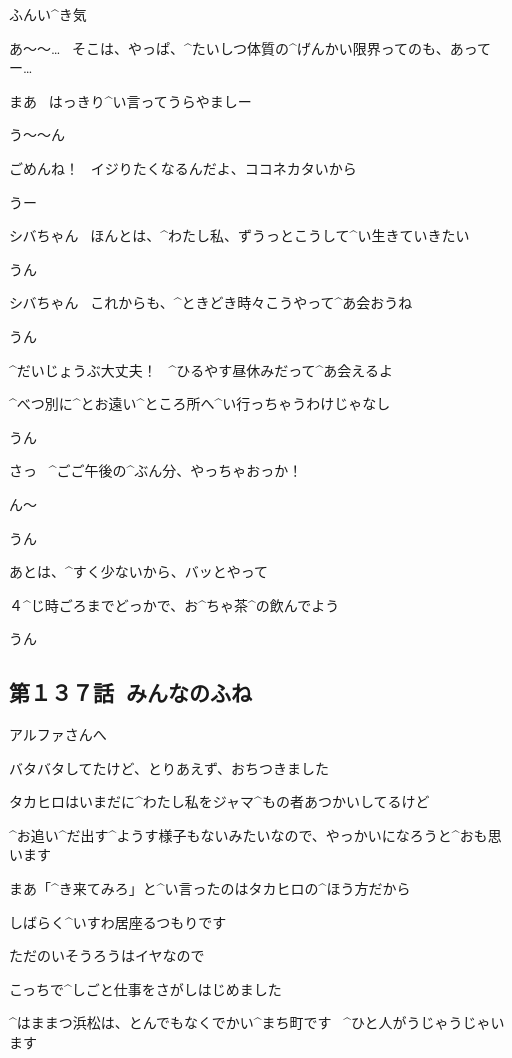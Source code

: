 \SH ふんい^{き}{気}

\K あ〜〜…
\ そこは、やっぱ、^{たいしつ}{体質}の^{げんかい}{限界}ってのも、あってー…

\SH まあ
\ はっきり^{い}{言}ってうらやましー

\K う〜〜ん

\page
\SH ごめんね！
\ イジりたくなるんだよ、ココネカタいから

\K うー

\page
\K シバちゃん
\ ほんとは、^{わたし}{私}、ずうっとこうして^{い}{生}きていきたい

\SH うん

\page
\K シバちゃん
\ これからも、^{ときどき}{時々}こうやって^{あ}{会}おうね

\SH うん

\SH ^{だいじょうぶ}{大丈夫}！
\ ^{ひるやす}{昼休}みだって^{あ}{会}えるよ

\SH ^{べつ}{別}に^{とお}{遠}い^{ところ}{所}へ^{い}{行}っちゃうわけじゃなし

\K うん

\page[86]
\SH さっ
\ ^{ごご}{午後}の^{ぶん}{分}、やっちゃおっか！

\SH ん〜

\K うん

\SH あとは、^{すく}{少}ないから、バッとやって

\SH ４^{じ}{時}ごろまでどっかで、お^{ちゃ}{茶}^{の}{飲}んでよう

\K うん


\subsection{第１３７話\ みんなのふね}

\page[92]
\M アルファさんへ

\page
\M バタバタしてたけど、とりあえず、おちつきました

\M タカヒロはいまだに^{わたし}{私}をジャマ^{もの}{者}あつかいしてるけど

\M ^{お}{追}い^{だ}{出}す^{ようす}{様子}もないみたいなので、やっかいになろうと^{おも}{思}います

\page
\M まあ「^{き}{来}てみろ」と^{い}{言}ったのはタカヒロの^{ほう}{方}だから

\M しばらく^{いすわ}{居座}るつもりです

\M ただのいそうろうはイヤなので

\M こっちで^{しごと}{仕事}をさがしはじめました

\page
\M ^{はままつ}{浜松}は、とんでもなくでかい^{まち}{町}です
\ ^{ひと}{人}がうじゃうじゃいます

